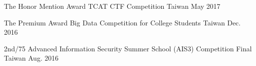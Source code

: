
\begin{cvhonors}


\cvhonor
{The Honor Mention Award} %
{TCAT CTF Competition} %
{Taiwan} %
{May 2017} %


\cvhonor
{The Premium Award} %
{Big Data Competition for College Students} %
{Taiwan} %
{Dec. 2016} %


\cvhonor
{2nd/75} %
{Advanced Information Security Summer School (AIS3) Competition Final} %
{Taiwan} %
{Aug. 2016} %


\end{cvhonors}